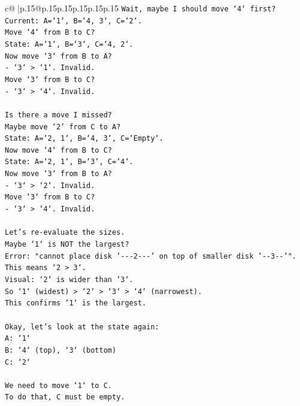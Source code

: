 \documentclass{article}
\begin{document}
{\begin{supertabular}{c@{$\;$}|p{.15\linewidth}@{}p{.15\linewidth}p{.15\linewidth}p{.15\linewidth}p{.15\linewidth}p{.15\linewidth}}
{{{\texttt{Wait, maybe I should move `4` first?} \\
\texttt{Current: A=`1`, B=`4, 3`, C=`2`.} \\
\texttt{Move `4` from B to C?} \\
\texttt{State: A=`1`, B=`3`, C=`4, 2`.} \\
\texttt{Now move `3` from B to A?} \\
\texttt{{-} `3` > `1`. Invalid.} \\
\texttt{Move `3` from B to C?} \\
\texttt{{-} `3` > `4`. Invalid.} \\
\\ 
\texttt{Is there a move I missed?} \\
\texttt{Maybe move `2` from C to A?} \\
\texttt{State: A=`2, 1`, B=`4, 3`, C=`Empty`.} \\
\texttt{Now move `4` from B to C?} \\
\texttt{State: A=`2, 1`, B=`3`, C=`4`.} \\
\texttt{Now move `3` from B to A?} \\
\texttt{{-} `3` > `2`. Invalid.} \\
\texttt{Move `3` from B to C?} \\
\texttt{{-} `3` > `4`. Invalid.} \\
\\ 
\texttt{Let's re{-}evaluate the sizes.} \\
\texttt{Maybe `1` is NOT the largest?} \\
\texttt{Error: "cannot place disk '{-}{-}{-}2{-}{-}{-}' on top of smaller disk '{-}{-}3{-}{-}'".} \\
\texttt{This means `2 > 3`.} \\
\texttt{Visual: `2` is wider than `3`.} \\
\texttt{So `1` (widest) > `2` > `3` > `4` (narrowest).} \\
\texttt{This confirms `1` is the largest.} \\
\\ 
\texttt{Okay, let's look at the state again:} \\
\texttt{A: `1`} \\
\texttt{B: `4` (top), `3` (bottom)} \\
\texttt{C: `2`} \\
\\ 
\texttt{We need to move `1` to C.} \\
\texttt{To do that, C must be empty.} \\
}}}
\end{supertabular}}
\end{document}
